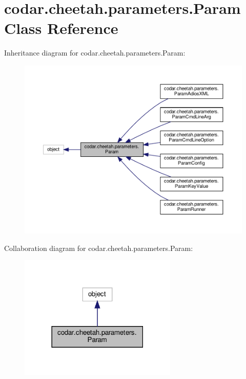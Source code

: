 \hypertarget{classcodar_1_1cheetah_1_1parameters_1_1_param}{}\section{codar.\+cheetah.\+parameters.\+Param Class Reference}
\label{classcodar_1_1cheetah_1_1parameters_1_1_param}


Inheritance diagram for codar.\+cheetah.\+parameters.\+Param\+:
\nopagebreak
\begin{figure}[H]
\begin{center}
\leavevmode
\includegraphics[width=350pt]{classcodar_1_1cheetah_1_1parameters_1_1_param__inherit__graph}
\end{center}
\end{figure}


Collaboration diagram for codar.\+cheetah.\+parameters.\+Param\+:
\nopagebreak
\begin{figure}[H]
\begin{center}
\leavevmode
\includegraphics[width=213pt]{classcodar_1_1cheetah_1_1parameters_1_1_param__coll__graph}
\end{center}
\end{figure}
